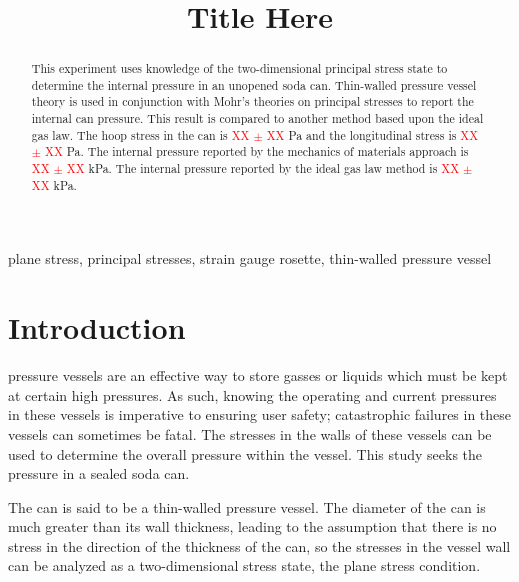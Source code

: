 \documentclass[10pt,journal,letterpaper]{IEEEtran}
\begin{document}
\title{Title Here}

\author{
}

\maketitle
\thispagestyle{empty}

\newcommand{\todo}{\textcolor{red}{???}}

\begin{abstract}
This experiment uses knowledge of the two-dimensional principal stress state to determine the internal pressure in an unopened soda can.
Thin-walled pressure vessel theory is used in conjunction with Mohr’s theories on principal stresses to report the internal can pressure.
This result is compared to another method based upon the ideal gas law.
The hoop stress in the can is \textcolor{red}{XX $\pm$ XX} Pa and the longitudinal stress is \textcolor{red}{XX $\pm$ XX} Pa.
The internal pressure reported by the mechanics of materials approach is \textcolor{red}{XX $\pm$ XX} kPa.
The internal pressure reported by the ideal gas law method is \textcolor{red}{XX $\pm$ XX} kPa.

\end{abstract}

\begin{IEEEkeywords}
plane stress, principal stresses, strain gauge rosette, thin-walled pressure vessel
\end{IEEEkeywords}

\section{Introduction}
 pressure vessels are an effective way to store gasses or liquids which must be kept at certain high pressures.
As such, knowing the operating and current pressures in these vessels is imperative to ensuring user safety; catastrophic failures in these vessels can sometimes be fatal.
The stresses in the walls of these vessels can be used to determine the overall pressure within the vessel.
This study seeks the pressure in a sealed soda can.

The can is said to be a thin-walled pressure vessel.
The diameter of the can is much greater than its wall thickness, leading to the  assumption that there is no stress in the direction of the thickness of the can, so the stresses in the vessel wall can be analyzed as a two-dimensional stress state, the plane stress condition.
\end{document}

